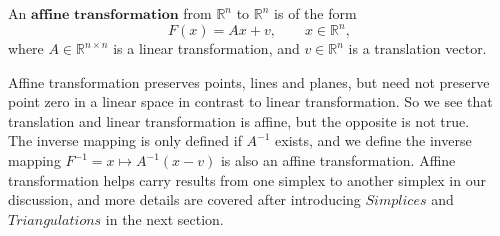       \begin{definition*}
      An $\textbf{affine transformation}$ from $\mathbb{R}^n$ to $\mathbb{R}^n$ is of the form\\
      \begin{equation*}
      {F}(x) = {Ax} + {v}, \qquad {x}\in\mathbb{R}^n,
      \end{equation*}
      where ${A}\in\mathbb{R}^{n\times n}$ is a linear transformation, and  ${v}\in\mathbb{R}^n$ is a translation vector.\\
      \end{definition*}
      Affine transformation preserves points, lines and planes, but need not preserve point zero in a linear space in contrast to linear transformation. So we see that translation and linear transformation is affine, but the opposite is not true.\\
      The inverse mapping is only defined if $A^{-1}$ exists, and we define the inverse mapping $F^{-1} = {x} \mapsto {A}^{-1}({x} - {v})$ is also an affine transformation. Affine transformation helps carry results from one simplex to another simplex in our discussion, and more details are covered after introducing ${Simplices}$ and ${Triangulations}$ in the next section.


